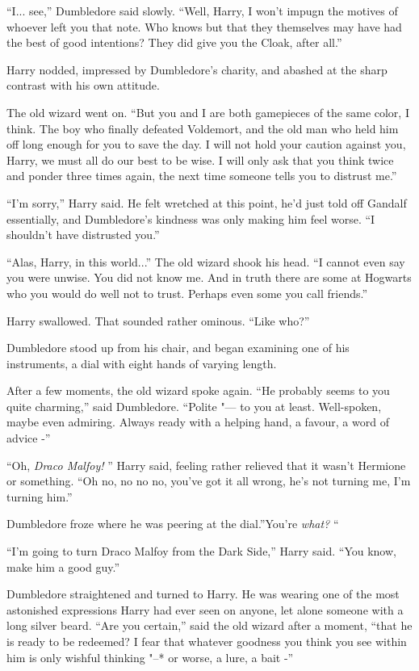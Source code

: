 ``I... see,'' Dumbledore said slowly. ``Well, Harry, I won't impugn
the motives of whoever left you that note. Who knows but that they
themselves may have had the best of good intentions? They did give you
the Cloak, after all.''

Harry nodded, impressed by Dumbledore's charity, and abashed at the
sharp contrast with his own attitude.

The old wizard went on. ``But you and I are both gamepieces of the same
color, I think. The boy who finally defeated Voldemort, and the old man
who held him off long enough for you to save the day. I will not hold
your caution against you, Harry, we must all do our best to be wise. I
will only ask that you think twice and ponder three times again, the
next time someone tells you to distrust me.''

``I'm sorry,'' Harry said. He felt wretched at this point, he'd just
told off Gandalf essentially, and Dumbledore's kindness was only making
him feel worse. ``I shouldn't have distrusted you.''

``Alas, Harry, in this world...'' The old wizard shook his head.
``I cannot even say you were unwise. You did not know me. And in truth
there are some at Hogwarts who you would do well not to trust. Perhaps
even some you call friends.''

Harry swallowed. That sounded rather ominous. ``Like who?''

Dumbledore stood up from his chair, and began examining one of his
instruments, a dial with eight hands of varying length.

After a few moments, the old wizard spoke again. ``He probably seems to
you quite charming,'' said Dumbledore. ``Polite "--- to you at least.
Well-spoken, maybe even admiring. Always ready with a helping hand, a
favour, a word of advice -''

``Oh, \emph{Draco Malfoy!} '' Harry said, feeling rather relieved that it
wasn't Hermione or something. ``Oh no, no no no, you've got it all
wrong, he's not turning me, I'm turning him.''

Dumbledore froze where he was peering at the dial.''You're \emph{what?}
``

``I'm going to turn Draco Malfoy from the Dark Side,'' Harry said. ``You
know, make him a good guy.''

Dumbledore straightened and turned to Harry. He was wearing one of the
most astonished expressions Harry had ever seen on anyone, let alone
someone with a long silver beard. ``Are you certain,'' said the old
wizard after a moment, ``that he is ready to be redeemed? I fear that
whatever goodness you think you see within him is only wishful thinking
"--* or worse, a lure, a bait -''

